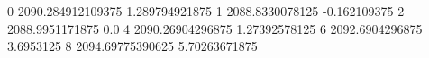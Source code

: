 0 2090.284912109375 1.289794921875
1 2088.8330078125 -0.162109375
2 2088.9951171875 0.0
4 2090.26904296875 1.27392578125
6 2092.6904296875 3.6953125
8 2094.69775390625 5.70263671875
